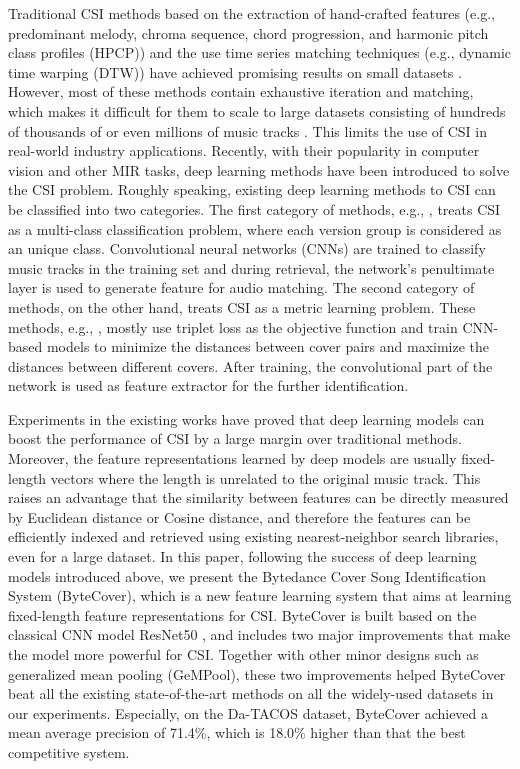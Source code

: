 \documentclass{article}
\begin{document}
Traditional CSI methods based on the extraction of hand-crafted features (e.g., predominant melody, chroma sequence, chord progression, and harmonic pitch class profiles (HPCP)) and the use time series matching techniques (e.g., dynamic time warping (DTW)) have achieved promising results on small datasets \cite{marolt2006mid, ellis2007identifying, serra2008chroma, serra2009cross}. However, most of these methods contain exhaustive iteration and matching, which makes it difficult for them to scale to large datasets consisting of hundreds of thousands of or even millions of music tracks \cite{xu2018effective, yesiler2020accurate}. This limits the use of CSI in real-world industry applications. Recently, with their popularity in computer vision and other MIR tasks, deep learning methods have been introduced to solve the CSI problem. Roughly speaking, existing deep learning methods to CSI can be classified into two categories. The first category of methods, e.g., \cite{xu2018key, yu2019temporal, yu2020learning}, treats CSI as a multi-class classification problem, where each version group is considered as an unique class. Convolutional neural networks (CNNs) are trained to classify music tracks in the training set and during retrieval, the network's penultimate layer is used to generate feature for audio matching. The second category of methods, on the other hand, treats CSI as a metric learning problem. These methods, e.g., \cite{doras2019cover, yesiler2020accurate}, mostly use triplet loss as the objective function and train CNN-based models to minimize the distances between cover pairs and maximize the distances between different covers. After training, the convolutional part of the network is used as feature extractor for the further identification.

Experiments in the existing works have proved that deep learning models can boost the performance of CSI by a large margin over traditional methods. Moreover, the feature representations learned by deep models are usually fixed-length vectors where the length is unrelated to the original music track. This raises an advantage that the similarity between features can be directly measured by Euclidean distance or Cosine distance, and therefore the features can be efficiently indexed and retrieved using existing nearest-neighbor search libraries, even for a large dataset. In this paper, following the success of deep learning models introduced above, we present the Bytedance Cover Song Identification System (ByteCover), which is a new feature learning system that aims at learning fixed-length feature representations for CSI. ByteCover is built based on the classical CNN model ResNet50 \cite{he2016deep}, and includes two major improvements that make the model more powerful for CSI. Together with other minor designs such as generalized mean pooling (GeMPool), these two improvements helped ByteCover beat all the existing state-of-the-art methods on all the widely-used datasets in our experiments. Especially, on the Da-TACOS dataset, ByteCover achieved a mean average precision of 71.4\%, which is 18.0\% higher than that the best competitive system.
\end{document}
